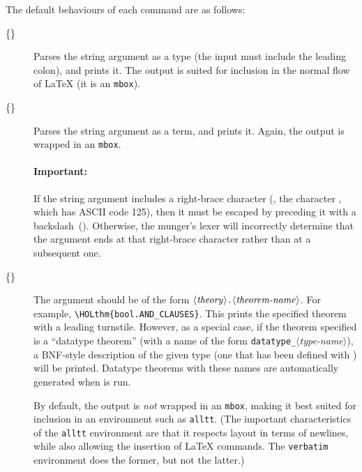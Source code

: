 The default behaviours of each command are as follows:
\begin{description}
\item[\holty\{\textit{}\}]
%
%
Parses the string argument as a type (the input must include the leading colon), and prints it.
%
The output is suited for inclusion in the normal flow of \LaTeX{} (it is an \texttt{\bs{}mbox}).
\item[\holtm\{\textit{}\}]
%
%
Parses the string argument as a term, and prints it.
%
Again, the output is wrapped in an \texttt{\bs{}mbox}.

\paragraph{Important:} If the string argument includes a right-brace character
(\ie, the character \rb, which has ASCII code 125), then it must be
escaped by preceding it with a backslash~(\bs).  Otherwise, the
munger's lexer will incorrectly determine that the argument ends at
that right-brace character rather than at a subsequent one.
\item[\holthm\{\textit{}\}]
%
%
The argument should be of the form $\langle\mbox{\textit{theory}}\rangle\texttt{.}\langle{\mbox{\textit{theorem-name}}}\rangle$.
%
For example, \verb|\HOLthm{bool.AND_CLAUSES}|.
%
This prints the specified theorem with a leading turnstile.
%
However, as a special case, if the theorem specified is a ``datatype theorem'' (with a name of the form \texttt{datatype\_}$\langle$\textit{type-name}$\rangle$), a BNF-style description of the given type (one that has been defined with ) will be printed.
%
Datatype theorems with these names are automatically generated when  is run.

By default, the output is \emph{not} wrapped in an \texttt{\bs{}mbox}, making it best suited for inclusion in an environment such as \texttt{alltt}.
(The important characteristics of the \texttt{alltt} environment are that it respects layout in terms of newlines, while also allowing the insertion of \LaTeX{} commands.
The \texttt{verbatim} environment does the former, but not the latter.)
\end{description}

